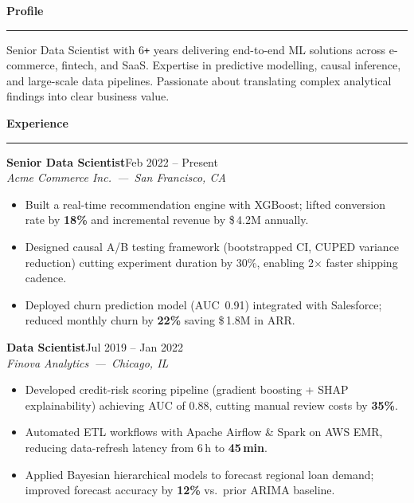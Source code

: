 \documentclass[10pt]{article}
\newlength{\sbw}\setlength{\sbw}{72mm}
\newcommand{\mainheading}[1]{%
  \vspace{5pt}%
  {\color{accent}\bfseries\large #1}\\[-2pt]%
  {\color{accent}\rule{\dimexpr\paperwidth-\sbw-14mm\relax}{1.2pt}}%
  \vspace{2pt}%
}
\newcommand{\expentry}[3]{%
  \vspace{2pt}%
  \noindent\parbox{\dimexpr\paperwidth-\sbw-14mm\relax}{%
    {\bfseries #1}\hfill{\small\color{accent}#3}\\
    {\small\itshape #2}%
  }%
  \vspace{1pt}%
}
\begin{document}
\begin{minipage}[t]{\dimexpr\paperwidth-\sbw\relax}\vspace{10mm}\hspace{6mm}%
\begin{minipage}[t]{\dimexpr\paperwidth-\sbw-14mm\relax}\color{maingray}

  \mainheading{Profile}

  \vspace{2pt}
  Senior Data Scientist with 6\texttt{+} years delivering end-to-end ML solutions
  across e-commerce, fintech, and SaaS. Expertise in predictive modelling,
  causal inference, and large-scale data pipelines. Passionate about translating
  complex analytical findings into clear business value.

  \mainheading{Experience}

  \expentry{Senior Data Scientist}{Acme Commerce Inc.\ ---\ San Francisco, CA}{Feb 2022 -- Present}
  \begin{itemize}[leftmargin=*,topsep=1pt,itemsep=0pt,parsep=0pt]
    \item Built a real-time recommendation engine with XGBoost; lifted conversion
          rate by \textbf{18\%} and incremental revenue by \$\,4.2M annually.
    \item Designed causal A/B testing framework (bootstrapped CI, CUPED variance
          reduction) cutting experiment duration by 30\%, enabling 2$\times$ faster
          shipping cadence.
    \item Deployed churn prediction model (AUC~0.91) integrated with Salesforce;
          reduced monthly churn by \textbf{22\%} saving \$\,1.8M in ARR.
  \end{itemize}

  \vspace{3pt}
  \expentry{Data Scientist}{Finova Analytics\ ---\ Chicago, IL}{Jul 2019 -- Jan 2022}
  \begin{itemize}[leftmargin=*,topsep=1pt,itemsep=0pt,parsep=0pt]
    \item Developed credit-risk scoring pipeline (gradient boosting + SHAP
          explainability) achieving AUC of 0.88, cutting manual review costs
          by \textbf{35\%}.
    \item Automated ETL workflows with Apache Airflow \& Spark on AWS EMR,
          reducing data-refresh latency from 6\,h to \textbf{45\,min}.
    \item Applied Bayesian hierarchical models to forecast regional loan demand;
          improved forecast accuracy by \textbf{12\%} vs.\ prior ARIMA baseline.
  \end{itemize}


\end{minipage}
\end{minipage}
\end{document}
